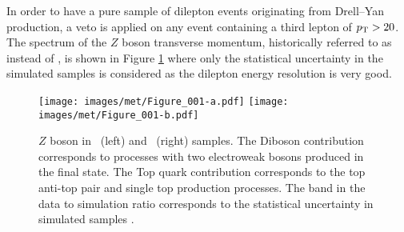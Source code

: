 In order to have a pure sample of dilepton events originating from Drell--Yan production, a veto is applied on any event containing a third lepton of $p_{\mathrm{T}} > 20$\GeV. 
The spectrum of the $Z$ boson transverse momentum, historically referred to as \qt instead of \pt, is shown in Figure \ref{fig:zbosonpt} where only the statistical uncertainty in the simulated samples is considered as the dilepton energy resolution is very good.
\begin{figure}[!htb]
  \centering
  \texttt{[image: images/met/Figure\_001-a.pdf]}
  \texttt{[image: images/met/Figure\_001-b.pdf]}
  \caption{$Z$ boson \qt in \Zmm\ (left) and \Zee\ (right) samples. The Diboson contribution corresponds to processes with two electroweak bosons produced in the final state. The Top quark contribution corresponds to the top anti-top pair and single top production processes. The band in the data to simulation ratio corresponds to the statistical uncertainty in simulated samples \cite{Sirunyan:2019kia}. }
  \label{fig:zbosonpt}
\end{figure}
